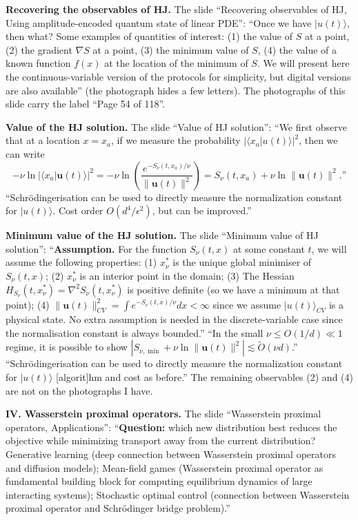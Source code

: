 \medskip\noindent
{\bf Recovering the observables of HJ.}
The slide ``Recovering observables of HJ,
Using amplitude-encoded quantum state of
linear PDE'': ``Once we have $|u(t)\rangle$,
then what? Some examples of quantities of
interest: (1) the value of $S$ at a point,
(2) the gradient $\nabla S$ at a point, (3) the
minimum value of $S$, (4) the value of a
known function $f(x)$ at the location of the
minimum of $S$. We will present here the
continuous-variable version of the protocols
for simplicity, but digital versions are also
available'' (the photograph hides a few
letters). The photographs of this slide carry
the label ``Page 54 of 118''.

\medskip\noindent
{\bf Value of the HJ solution.}
The slide ``Value of HJ solution'': ``We first
observe that at a location $x=x_a$, if we
measure the probability
$|\langle x_a|u(t)\rangle|^2$, then we can
write
$$
-\nu\ln|\langle x_a|\mathbf{u}(t)\rangle|^2
=-\nu\ln\left(\frac{e^{-S_\nu(t,x_a)/\nu}}
{\|\mathbf{u}(t)\|^2}\right)
=S_\nu(t,x_a)+\nu\ln\|\mathbf{u}(t)\|^2.
\text{''}
$$
``Schr\"odingerisation can be used to directly
measure the normalization constant for
$|u(t)\rangle$. Cost order
$O(d^4/\epsilon^2)$, but can be improved.''

\medskip\noindent
{\bf Minimum value of the HJ solution.}
The slide ``Minimum value of HJ solution'':
``{\bf Assumption.} For the function
$S_\nu(t,x)$ at some constant $t$, we will
assume the following properties: (1)
$x_\nu^*$ is the unique global minimiser of
$S_\nu(t,x)$; (2) $x_\nu^*$ is an interior
point in the domain; (3) The Hessian
$H_{S_\nu}(t,x_\nu^*)=\nabla^2S_\nu(t,x_\nu^*)$
is positive definite (so we have a minimum at
that point); (4)
$\|\mathbf{u}(t)\|_{CV}^2=\int e^{-S_\nu(t,x)
/\nu}dx<\infty$ since we assume $|u(t)
\rangle_{CV}$ is a physical state. No extra
assumption is needed in the discrete-variable
case since the normalisation constant is
always bounded.'' ``In the small
$\nu\le O(1/d)\ll1$ regime, it is possible to
show $|S_{\nu,\min}+\nu\ln\|\mathbf{u}(t)
\|^2|\lesssim\tilde O(\nu d)$.''
``Schr\"odingerisation can be used to directly measure the
normalization constant for $|u(t)\rangle$
[algorit]hm and cost as before.'' The remaining
observables (2) and (4) are not on the
photographs I have.

\medskip\noindent
{\bf IV. Wasserstein proximal operators.}
The slide ``Wasserstein proximal operators,
Applications'': ``{\bf Question:} which new
distribution best reduces the objective while
minimizing transport away from the current
distribution? Generative learning (deep
connection between Wasserstein proximal
operators and diffusion models); Mean-field
games (Wasserstein proximal operator as
fundamental building block for computing
equilibrium dynamics of large interacting
systems); Stochastic optimal control
(connection between Wasserstein proximal
operator and Schr\"odinger bridge problem).''

